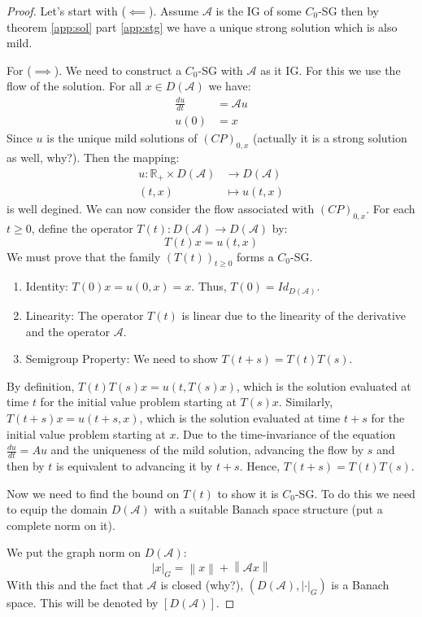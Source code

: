\documentclass[12pt, oneside]{book}
\newcommand{\norm}[1]{\left\lVert#1\right\rVert}
\newcommand{\A}{\mathscr{A}}
\begin{document}
\begin{proof}
	Let's start with ($\impliedby$). Assume $\A$ is the IG of some $C_0$-SG then by theorem \ref{app:sol} part \ref{app:stg} we have a unique strong solution which is also mild.

	\bigskip

	For ($\implies$). We need to construct a $C_0$-SG with $\A$ as it IG. For this we use the flow of the solution. For all $x \in D(\A)$ we have:
	\begin{align*}
		\frac{du}{dt} &= \A u \\
		u(0) &= x
	\end{align*}
	Since $u$ is the unique mild solutions of $(CP)_{0, x}$ (actually it is a strong solution as well, why?). Then the mapping:
	\begin{align*}
		u: \mathbb{R}_+ \times D(\A) &\to D(\A) \\
		(t, x) &\mapsto u(t, x)
	\end{align*}
	is well degined. We can now consider the flow associated with $(CP)_{0,x}$. For each $t \ge 0$, define the operator $T(t): D(\A) \to D(\A)$ by:
	$$
		T(t)x = u(t,x)
	$$
	We must prove that the family $\left(T(t)\right)_{t \ge 0}$ forms a $C_0$-SG.
	\begin{enumerate}
	    \item Identity: $T(0)x = u(0,x) = x$. Thus, $T(0) = Id_{D(\A)}$.
	    \item Linearity: The operator $T(t)$ is linear due to the linearity of the derivative and the operator $\A$.
	    \item Semigroup Property: We need to show $T(t+s) = T(t)T(s)$.
	\end{enumerate}

	    By definition, $T(t)T(s)x = u(t, T(s)x)$, which is the solution evaluated at time $t$ for the initial value problem starting at $T(s)x$. Similarly, $T(t+s)x = u(t+s, x)$, which is the solution evaluated at time $t+s$ for the initial value problem starting at $x$. Due to the time-invariance of the equation $\frac{du}{dt} = Au$ and the uniqueness of the mild solution, advancing the flow by $s$ and then by $t$ is equivalent to advancing it by $t+s$. Hence, $T(t+s) = T(t)T(s)$.

	    \bigskip

	    Now we need to find the bound on $T(t)$ to show it is $C_0$-SG. To do this we need to equip the domain $D(\A)$ with a suitable Banach space structure (put a complete norm on it).

	We put the graph norm on $D(\A)$:
$$
|x|_G = \norm{x} + \norm{\A x}
$$
With this and the fact that $\A$ is closed (why?), $(D(\A), |\cdot|_G)$ is a Banach space. This will be denoted by $\left[D(\A)\right]$.


\end{proof}
\end{document}
